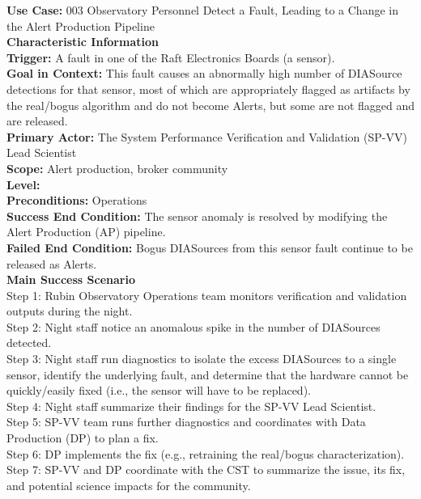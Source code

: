 \textbf{Use Case:} 003 Observatory Personnel Detect a Fault, Leading to a Change in the Alert Production Pipeline \\

\textbf{Characteristic Information} \\
\textbf{Trigger:} A fault in one of the Raft Electronics Boards (a sensor). \\
\textbf{Goal in Context:} This fault causes an abnormally high number of DIASource detections for that sensor, most of which are appropriately flagged as artifacts by the real/bogus algorithm and do not become Alerts, but some are not flagged and are released. \\
\textbf{Primary Actor:} The System Performance Verification and Validation (SP-VV) Lead Scientist \\
\textbf{Scope:} Alert production, broker community \\
\textbf{Level:} \\
\textbf{Preconditions:} Operations \\
\textbf{Success End Condition:} The sensor anomaly is resolved by modifying the Alert Production (AP) pipeline. \\
\textbf{Failed End Condition:} Bogus DIASources from this sensor fault continue to be released as Alerts. \\

\textbf{Main Success Scenario} \\
Step 1: Rubin Observatory Operations team monitors verification and validation outputs during the night. \\
Step 2: Night staff notice an anomalous spike in the number of DIASources detected. \\
Step 3: Night staff run diagnostics to isolate the excess DIASources to a single sensor, identify the underlying fault, and determine that the hardware cannot be quickly/easily fixed (i.e., the sensor will have to be replaced). \\
Step 4: Night staff summarize their findings for the SP-VV Lead Scientist. \\
Step 5: SP-VV team runs further diagnostics and coordinates with Data Production (DP) to plan a fix. \\
Step 6: DP implements the fix (e.g., retraining the real/bogus characterization). \\
Step 7: SP-VV and DP coordinate with the CST to summarize the issue, its fix, and potential science impacts for the community. \\


